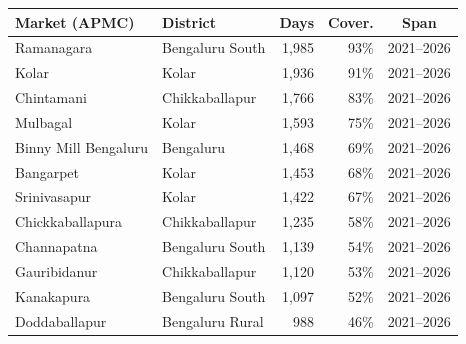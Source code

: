 \begin{tabular}{llrrc}
\toprule
Market (APMC) & District & Days & Cover. & Span\\
\midrule
Ramanagara & Bengaluru South & 1{,}985 & 93\% & 2021--2026\\
Kolar & Kolar & 1{,}936 & 91\% & 2021--2026\\
Chintamani & Chikkaballapur & 1{,}766 & 83\% & 2021--2026\\
Mulbagal & Kolar & 1{,}593 & 75\% & 2021--2026\\
Binny Mill Bengaluru & Bengaluru & 1{,}468 & 69\% & 2021--2026\\
Bangarpet & Kolar & 1{,}453 & 68\% & 2021--2026\\
Srinivasapur & Kolar & 1{,}422 & 67\% & 2021--2026\\
Chickkaballapura & Chikkaballapur & 1{,}235 & 58\% & 2021--2026\\
Channapatna & Bengaluru South & 1{,}139 & 54\% & 2021--2026\\
Gauribidanur & Chikkaballapur & 1{,}120 & 53\% & 2021--2026\\
Kanakapura & Bengaluru South & 1{,}097 & 52\% & 2021--2026\\
Doddaballapur & Bengaluru Rural & 988 & 46\% & 2021--2026\\
\bottomrule
\end{tabular}